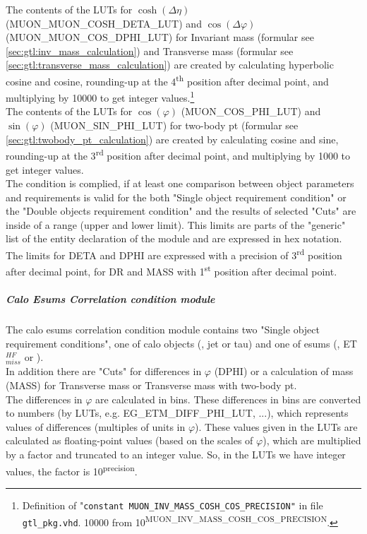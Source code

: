 The contents of the LUTs for $\cosh(\Delta\eta)$ (\small{MUON\_MUON\_COSH\_DETA\_LUT}\normalsize) and $\cos(\Delta\varphi)$ (\small{MUON\_MUON\_COS\_DPHI\_LUT}\normalsize) for Invariant mass
(formular see \ref{sec:gtl:inv_mass_calculation}) and Transverse mass (formular see \ref{sec:gtl:transverse_mass_calculation}) are created by calculating hyperbolic cosine and cosine, 
rounding-up at the 4\textsuperscript{th} position after decimal point,
and multiplying by 10000 to get integer values.\footnote{Definition of "\texttt{constant \small{MUON\_INV\_MASS\_COSH\_COS\_PRECISION}\normalsize"} in file \texttt{gtl\_pkg.vhd}.
10000 from 10\textsuperscript{\tiny{MUON\_INV\_MASS\_COSH\_COS\_PRECISION}}\normalsize.}\\
The contents of the LUTs for $\cos(\varphi)$ (\small{MUON\_COS\_PHI\_LUT}\normalsize) and $\sin(\varphi)$ (\small{MUON\_SIN\_PHI\_LUT}\normalsize) for two-body pt 
(formular see \ref{sec:gtl:twobody_pt_calculation}) are created by calculating cosine and sine, rounding-up at the 3\textsuperscript{rd} position after decimal point,
and multiplying by 1000 to get integer values.\\
The condition is complied, if at least one comparison between object parameters and requirements is valid for the both "Single object requirement condition" or the "Double objects requirement condition"
and the results of selected "Cuts" are inside of a range (upper and lower limit).
This limits are parts of the "generic" list of the entity declaration of the module and are expressed in hex notation. The limits for DETA and DPHI
are expressed with a precision of 3\textsuperscript{rd} position after decimal point, for DR and MASS with 1\textsuperscript{st} position after decimal point.

\subparagraph{Calo Esums Correlation condition module}
\label{sec:gtl:calo_esums_correlation_condition_module}

The calo esums correlation condition module contains two "Single object requirement conditions", one of calo objects (\egamma, jet or tau) and one of esums (\etm, ET$_{miss}^{HF}$ or \htm).\\
In addition there are "Cuts" for differences in $\varphi$ (DPHI) or a calculation of mass (MASS) for Transverse mass or Transverse mass with two-body pt.\\
The differences in $\varphi$ are calculated in bins. 
These differences in bins are converted to numbers (by LUTs, e.g. \small{EG\_ETM\_DIFF\_PHI\_LUT}\normalsize, ...),
which represents values of differences (multiples of units in $\varphi$).
These values given in the LUTs are calculated as floating-point values (based on the scales of $\varphi$), which are multiplied by a factor and truncated to an integer value.
So, in the LUTs we have integer values, the factor is 10\textsuperscript{\tiny{precision}\normalsize}.\\

